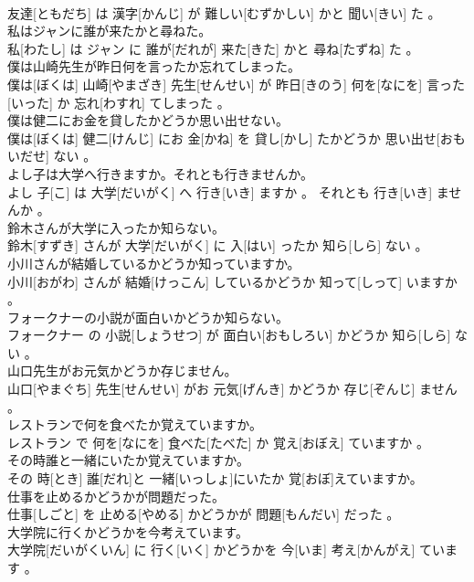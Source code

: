 \documentclass[8pt]{extreport}
\begin{document}
\begin{CJK}{UTF8}{min}
\\	友達[ともだち] は 漢字[かんじ] が 難しい[むずかしい] かと 聞い[きい] た 。
\\	私はジャンに誰が来たかと尋ねた。	
\\	私[わたし] は ジャン に 誰が[だれが] 来た[きた] かと 尋ね[たずね] た 。
\\	僕は山崎先生が昨日何を言ったか忘れてしまった。	
\\	僕は[ぼくは] 山崎[やまざき] 先生[せんせい] が 昨日[きのう] 何を[なにを] 言った[いった] か 忘れ[わすれ] てしまった 。
\\	僕は健二にお金を貸したかどうか思い出せない。	
\\	僕は[ぼくは] 健二[けんじ] にお 金[かね] を 貸し[かし] たかどうか 思い出せ[おもいだせ] ない 。
\\	よし子は大学へ行きますか。それとも行きませんか。	
\\	よし 子[こ] は 大学[だいがく] へ 行き[いき] ますか 。 それとも 行き[いき] ませんか 。
\\	鈴木さんが大学に入ったか知らない。	
\\	鈴木[すずき] さんが 大学[だいがく] に 入[はい] ったか 知ら[しら] ない 。
\\	小川さんが結婚しているかどうか知っていますか。	
\\	小川[おがわ] さんが 結婚[けっこん] しているかどうか 知って[しって] いますか 。
\\	フォークナーの小説が面白いかどうか知らない。	
\\	フォークナー の 小説[しょうせつ] が 面白い[おもしろい] かどうか 知ら[しら] ない 。
\\	山口先生がお元気かどうか存じません。	
\\	山口[やまぐち] 先生[せんせい] がお 元気[げんき] かどうか 存じ[ぞんじ] ません 。
\\	レストランで何を食べたか覚えていますか。	
\\	レストラン で 何を[なにを] 食べた[たべた] か 覚え[おぼえ] ていますか 。
\\	その時誰と一緒にいたか覚えていますか。	
\\	その 時[とき] 誰[だれ]と 一緒[いっしょ]にいたか 覚[おぼ]えていますか。
\\	仕事を止めるかどうかが問題だった。	
\\	仕事[しごと] を 止める[やめる] かどうかが 問題[もんだい] だった 。
\\	大学院に行くかどうかを今考えています。	
\\	大学院[だいがくいん] に 行く[いく] かどうかを 今[いま] 考え[かんがえ] ています 。

\end{CJK}
\end{document}
